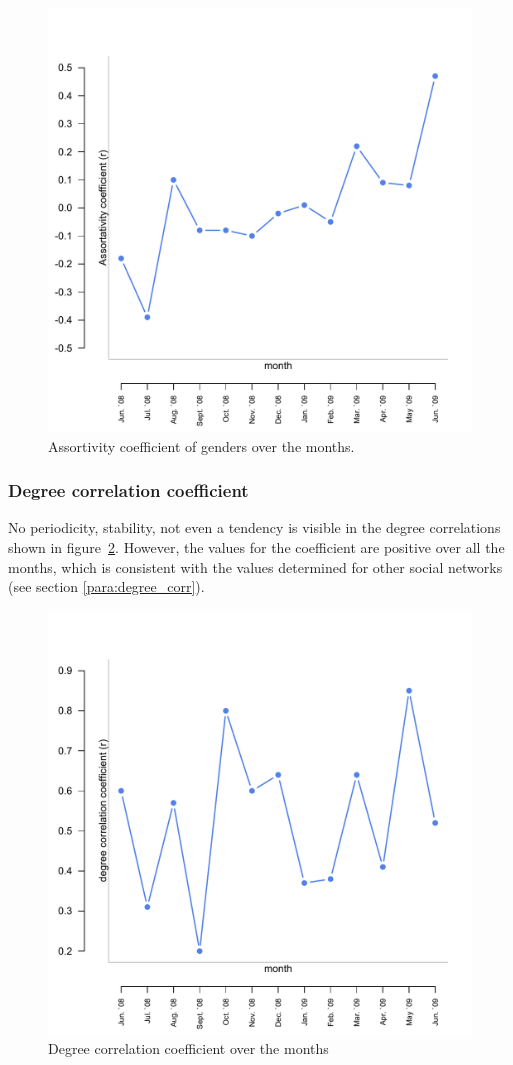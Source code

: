\begin{figure}[htpb]
\begin{center}
  \includegraphics[width=.6\textwidth]{assets/pdf/long_gender_corr.pdf}
  \caption[Assortivity coefficient of genders over the months]{Assortivity coefficient of genders over the months.}
  \label{fig:long_gender_corr}
\end{center}
\end{figure} 


\subsubsection{Degree correlation coefficient}

No periodicity, stability, not even a tendency is visible in the degree correlations shown in figure~\ref{fig:long_degree_cor}. However, the values for the coefficient are positive over all the months, which is consistent with the values determined for other social networks (see section \ref{para:degree_corr}). 

\begin{figure}[hbtp]
\begin{center}
  \includegraphics[width=.6\textwidth]{assets/pdf/long_degree_corr.pdf}
  \caption[Degree correlation coefficient over the months]{Degree correlation coefficient over the months}
  \label{fig:long_degree_cor}
\end{center}
\end{figure} 


